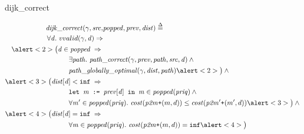 \documentclass[usenames, xcolor=dvipsnames]{beamer}
\newcommand{\ifty}{\texttt{inf}}
\newcommand{\defeq}{\mathbin{\stackrel{\Delta}{=}}}
\newcommand{\m}[1]{\ensuremath{\mathit{#1}}} %
\begin{document}
\begin{frame}{dijk\_correct}

\begin{equation*}
\begin{split}
\m{dijk\_correct}(\gamma, \m{src}, &\m{popped}, \m{prev}, \m{dist}) \; \defeq \; \\
\forall \m{d}.~vvalid(\gamma, \m{d}) \Rightarrow \\
\alert<2>{\big( \m{d} \in \m{popped} \; \Rightarrow} \; & \\ 
& \hspace{-5em} \exists \m{path}.~\m{path\_correct}(\gamma, \m{prev}, \m{path}, \m{src}, \m{d}) \wedge \null \\
& \hspace{-5em} \m{path\_globally\_optimal}(\gamma, \m{dist}, \m{path}) \alert<2>{\big)} \wedge \null \\
\alert<3>{\big( \m{dist}[\m{d}] < \ifty \; \Rightarrow} \; & \\ 
& \hspace{-5em} \texttt{let }\m{m} \texttt{ := } \m{prev}[\m{d}] \texttt{ in } \m{m} \in \m{popped}(\m{priq}) \wedge \null \\
& \hspace{-5em} \forall \m{m'} \in \m{popped}(\m{priq}).~\m{cost}(\m{p2m} \texttt{+} (m, d)) \le \m{cost}(\m{p2m'} \texttt{+} (m', d)) \alert<3>{\big)} \wedge \null \\
\alert<4>{\big( \m{dist}[\m{d}] = \ifty \; \Rightarrow} \; & \\ 
& \hspace{-5em} \forall \m{m} \in \m{popped}(\m{priq}).~\m{cost}(\m{p2m} \texttt{+} (m, d)) = \ifty \alert<4>{\big)}
\end{split}
\end{equation*}

\end{frame}
\end{document}

